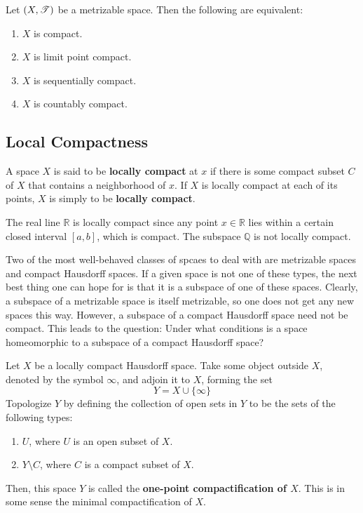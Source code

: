   \begin{theorem}
    Let $(X, \operatorname{\mathscr{T}})$ be a metrizable space. Then the following are equivalent: 
    \begin{enumerate}
      \item $X$ is compact. 
      \item $X$ is limit point compact. 
      \item $X$ is sequentially compact. 
      \item $X$ is countably compact. 
    \end{enumerate}
  \end{theorem}

\subsection{Local Compactness}

  \begin{definition}
    A space $X$ is said to be \textbf{locally compact} at $x$ if there is some compact subset $C$ of $X$ that contains a neighborhood of $x$. If $X$ is locally compact at each of its points, $X$ is simply to be \textbf{locally compact}. 
  \end{definition}

  \begin{example}
    The real line $\mathbb{R}$ is locally compact since any point $x \in \mathbb{R}$ lies within a certain closed interval $[a,b]$, which is compact. The subspace $\mathbb{Q}$ is not locally compact. 
  \end{example}

  Two of the most well-behaved classes of spcaes to deal with are metrizable spaces and compact Hausdorff spaces. If a given space is not one of these types, the next best thing one can hope for is that it is a subspace of one of these spaces. Clearly, a subspace of a metrizable space is itself metrizable, so one does not get any new spaces this way. However, a subspace of a compact Hausdorff space need not be compact. This leads to the question: Under what conditions is a space homeomorphic to a subspace of a compact Hausdorff space? 

  \begin{definition}[Compactification]
    Let $X$ be a locally compact Hausdorff space. Take some object outside $X$, denoted by the symbol $\infty$, and adjoin it to $X$, forming the set
    \begin{equation}
      Y = X \cup \{\infty\}
    \end{equation}
    Topologize $Y$ by defining the collection of open sets in $Y$ to be the sets of the following types:
    \begin{enumerate}
      \item $U$, where $U$ is an open subset of $X$. 
      \item $Y \setminus C$, where $C$ is a compact subset of $X$.
    \end{enumerate}
    Then, this space $Y$ is called the \textbf{one-point compactification of $X$}. This is in some sense the minimal compactification of $X$. 
  \end{definition}

